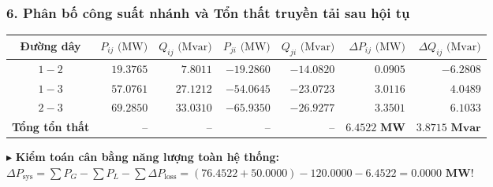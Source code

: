 \documentclass[10.5pt,a4paper]{article}
\begin{document}
\subsubsection*{6. Phân bố công suất nhánh và Tổn thất truyền tải sau hội tụ}
\vspace{-4pt}
\begin{table}[H]
\centering
\small
\begin{tabular}{crrrrrr}
\toprule
\textbf{Đường dây} & $P_{ij}\text{ (MW)}$ & $Q_{ij}\text{ (Mvar)}$ & $P_{ji}\text{ (MW)}$ & $Q_{ji}\text{ (Mvar)}$ & $\Delta P_{ij}\text{ (MW)}$ & $\Delta Q_{ij}\text{ (Mvar)}$ \\
\midrule
$1 - 2$ & $19.3765$ & $7.8011$ & $-19.2860$ & $-14.0820$ & $0.0905$ & $-6.2808$ \\
$1 - 3$ & $57.0761$ & $27.1212$ & $-54.0645$ & $-23.0723$ & $3.0116$ & $4.0489$ \\
$2 - 3$ & $69.2850$ & $33.0310$ & $-65.9350$ & $-26.9277$ & $3.3501$ & $6.1033$ \\
\midrule
\textbf{Tổng tổn thất} & -- & -- & -- & -- & $\mathbf{6.4522\text{ MW}}$ & $\mathbf{3.8715\text{ Mvar}}$ \\
\bottomrule
\end{tabular}
\end{table}

\vspace{-4pt}
\noindent $\blacktriangleright$ \textbf{Kiểm toán cân bằng năng lượng toàn hệ thống:}\\
$\Delta P_{\text{sys}} = \sum P_G - \sum P_L - \sum \Delta P_{\text{loss}} = (76.4522 + 50.0000) - 120.0000 - 6.4522 = \mathbf{0.0000\text{ MW}}$!
\end{document}
